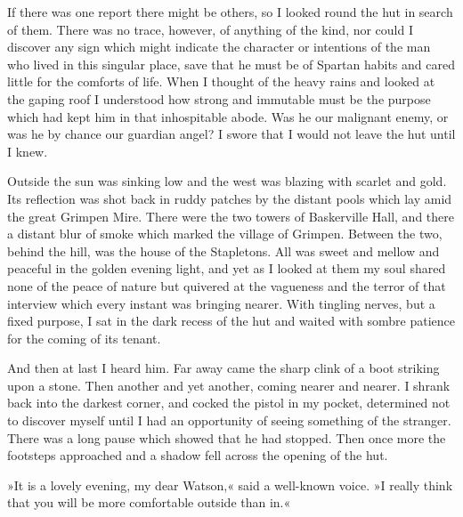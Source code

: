 If there was one report there might be others, so I looked round the hut in search of them. There was no trace, however, of anything of the kind, nor could I discover any sign which might indicate the character or intentions of the man who lived in this singular place, save that he must be of Spartan habits and cared little for the comforts of life. When I thought of the heavy rains and looked at the gaping roof I understood how strong and immutable must be the purpose which had kept him in that inhospitable abode. Was he our malignant enemy, or was he by chance our guardian angel? I swore that I would not leave the hut until I knew.

Outside the sun was sinking low and the west was blazing with scarlet and gold. Its reflection was shot back in ruddy patches by the distant pools which lay amid the great Grimpen Mire. There were the two towers of Baskerville Hall, and there a distant blur of smoke which marked the village of Grimpen. Between the two, behind the hill, was the house of the Stapletons. All was sweet and mellow and peaceful in the golden evening light, and yet as I looked at them my soul shared none of the peace of nature but quivered at the vagueness and the terror of that interview which every instant was bringing nearer. With tingling nerves, but a fixed purpose, I sat in the dark recess of the hut and waited with sombre patience for the coming of its tenant.

And then at last I heard him. Far away came the sharp clink of a boot striking upon a stone. Then another and yet another, coming nearer and nearer. I shrank back into the darkest corner, and cocked the pistol in my pocket, determined not to discover myself until I had an opportunity of seeing something of the stranger. There was a long pause which showed that he had stopped. Then once more the footsteps approached and a shadow fell across the opening of the hut.

»It is a lovely evening, my dear Watson,« said a well-known voice. »I really think that you will be more comfortable outside than in.«

